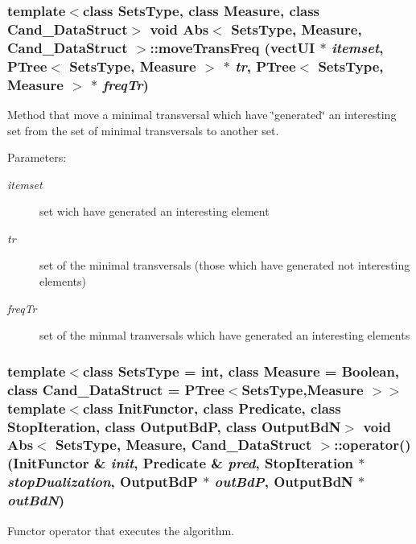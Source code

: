 \subsubsection{\setlength{\rightskip}{0pt plus 5cm}template$<$class Sets\-Type, class Measure, class Cand\_\-Data\-Struct$>$ void {\bf Abs}$<$ Sets\-Type, Measure, Cand\_\-Data\-Struct $>$::move\-Trans\-Freq (vect\-UI $\ast$ {\em itemset}, {\bf PTree}$<$ Sets\-Type, Measure $>$ $\ast$ {\em tr}, {\bf PTree}$<$ Sets\-Type, Measure $>$ $\ast$ {\em freq\-Tr})\hspace{0.3cm}{\tt  [protected]}}\label{class_abs_4069503604644bb7ddb2404a47098663}


Method that move a minimal transversal which have \char`\"{}generated\char`\"{} an interesting set from the set of minimal transversals to another set. 

\begin{Desc}
\item[Parameters:]
\begin{description}
\item[{\em itemset}]set wich have generated an interesting element \item[{\em tr}]set of the minimal transversals (those which have generated not interesting elements) \item[{\em freq\-Tr}]set of the minmal tranversals which have generated an interesting elements \end{description}
\end{Desc}
\subsubsection{\setlength{\rightskip}{0pt plus 5cm}template$<$class Sets\-Type = int, class Measure = Boolean, class Cand\_\-Data\-Struct = PTree$<$Sets\-Type,Measure $>$$>$ template$<$class Init\-Functor, class Predicate, class Stop\-Iteration, class Output\-Bd\-P, class Output\-Bd\-N$>$ void {\bf Abs}$<$ Sets\-Type, Measure, Cand\_\-Data\-Struct $>$::operator() (Init\-Functor \& {\em init}, {\bf Predicate} \& {\em pred}, Stop\-Iteration $\ast$ {\em stop\-Dualization}, Output\-Bd\-P $\ast$ {\em out\-Bd\-P}, Output\-Bd\-N $\ast$ {\em out\-Bd\-N})\hspace{0.3cm}{\tt  [inline]}}\label{class_abs_1cb8186e971cbb42b54d29bab5ba1e01}


Functor operator that executes the algorithm. 

